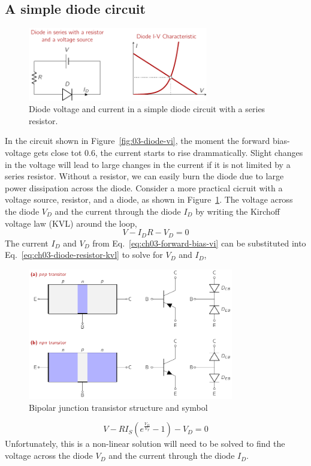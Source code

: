 \subsection{A simple diode circuit}
\begin{figure}[b]
    \centering
    \includegraphics[width=0.7\textwidth]{figures/ch03/fig03-diode-resistor-ckt.pdf}
    \caption{Diode voltage and current in a simple diode circuit with a series resistor.}
    \label{fig:03-diode-resistor-ckt}
\end{figure}
In the circuit shown in Figure~\ref{fig:03-diode-vi}, the moment the forward bias-voltage gets close tot 0.6, the current starts to rise drammatically. Slight changes in the voltage will lead to large changes in the current if it is not limited by a series resistor. Without a resistor, we can easily burn the diode due to large power dissipation across the diode. Consider a more practical cicruit with a voltage source, resistor, and a diode, as shown in Figure~\ref{fig:03-diode-resistor-ckt}. The voltage across the diode $V_D$ and the current through the diode $I_D$ by writing the Kirchoff voltage law (KVL) around the loop,
\begin{equation}
    V - I_D R - V_D = 0
    \label{eq:ch03-diode-resistor-kvl}
\end{equation}
The current $I_D$ and $V_D$ from Eq.~\ref{eq:ch03-forward-bias-vi} can be substituted into Eq.~\ref{eq:ch03-diode-resistor-kvl} to solve for $V_D$ and $I_D$,
\begin{figure}[t]
    \centering
    \includegraphics[width=0.8\textwidth]{figures/ch03/fig03-bjt-struct.pdf}
    \caption{Bipolar junction transistor structure and symbol}
    \label{fig:03-04}
\end{figure}
\begin{equation}
    V - R I_S \left( e^{\frac{V_D}{V_T}} - 1 \right) - V_D = 0
    \label{eq:ch03-diode-resistor-vd-id}
\end{equation}
Unfortunately, this is a non-linear solution will need to be solved to find the voltage across the diode $V_D$ and the current through the diode $I_D$. 

